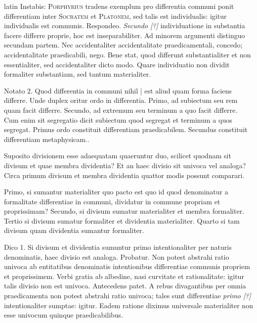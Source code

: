 \begin{otherlanguage*}{latin}
\pstart
Instabis:
\textsc{Porphyrius} tradens exemplum pro differentia communi ponit differentiam inter \textsc{Socratem} et \textsc{Platonem}, sed talis est individualis:
igitur individualis est communis. Respondeo. \emph{Secundo [?]} individuatione in substantia facere differre proprie, hoc est inseparabiliter. Ad minorem argumenti distinguo secundam partem. Nec accidentaliter accidentalitate praedicamentali, concedo; accidentalitate praedicabili, nego. Bene stat, quod differunt substantialiter et non essentialiter, sed accidentaliter dicto modo. Quare individuatio non dividit formaliter substantiam, sed tantum materialiter. 
\pend

\pstart
Notato 2. Quod differentia in communi nihil \textnormal{|} est aliud quam forma faciens differre. Unde duplex oritur ordo in differentia. Primo, ad subiectum seu rem quam facit differre. Secundo, ad extremum seu terminum a quo facit differre. Cum enim sit segregatio dicit subiectum quod segregat et terminum a quos segregat. Primus ordo constituit differentiam praedicabilem. Secundus constituit differentiam metaphysicam.. 
\pend

\pstart
Suposito divisionem esse adaequatam quaeruntur duo, scilicet quodnam sit divisum et quae membra dividentia? Et an haec divisio sit univoca vel analoga? Circa primum divisum et membra dividentia quattor modis possunt comparari. 
\pend

\pstart
Primo, si sumantur materialiter quo pacto est quo id quod denominatur a formalitate differentiae in communi, dividatur in commune propriam et proprissimam? Secundo, si divisum sumatur materialiter et membra formaliter. Tertio si divisum sumatur formaliter et dividentia materialiter. Quarto si tam divisum quam dividentia sumantur formaliter. 
\pend

\pstart
Dico 1. Si divisum et dividentia sumuntur primo intentionaliter per naturis denominatis, haec divisio est analoga. Probatur. Non potest abstrahi ratio univoca ab entitatibus denominatis intentionibus differentiae communis propriem et proprissimem. Verbi gratia ab albedine, nasi curvitate et rationalitate:
igitur talis divisio non est univoca. Antecedens patet. A rebus divagantibus per omnia praedicamenta non potest abstrahi ratio univoca; tales sunt differentiae \emph{primo [?]} intentionaliter sumptae:
igitur. Eadem ratione diximus universale materialiter non esse univocum quinque praedicabilibus. 
\pend


\end{otherlanguage*}
